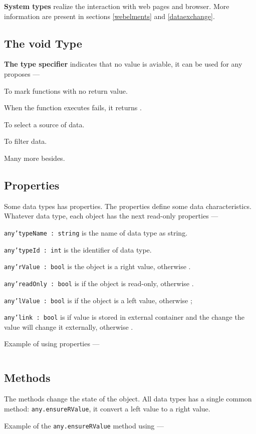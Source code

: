 {\bf System types} realize the interaction with web pages and browser. More information are present in sections \ref{webelments} and \ref{dataexchange}.

\subsection{The {\color{lightblue} void} Type}

{\bf The type specifier \void{}} indicates that no value is aviable, it can be used for any proposes —

\begin{icItems}
\item
	To mark functions with no return value.
\item
	When the function executes fails, it returns \void.
\item
	To select a source of data.
\item
	To filter data.
\item
	Many more besides.
\end{icItems}


\subsection{Properties}

Some data types has properties. The properties define some data characteristics.  Whatever data type, each object has the next read-only properties —

\begin{icItems}
\item
	\texttt{any'typeName : string} is the name of data type as string.
\item
	\texttt{any'typeId : int} is the identifier of data type.
\item
	\texttt{any'rValue : bool} is \true{} the object is a right value, otherwise \false{}.
\item
	\texttt{any'readOnly : bool} is \true{} if the object is read-only, otherwise \false{}.
\item
	\texttt{any'lValue : bool} is \true{} if the object is a left value, otherwise \false{};
\item
	\texttt{any'link : bool} is \true{} if value is stored in external container and the change the value will change it externally, otherwise \false{}.
\end{icItems}

Example of using properties —
\inputminted[linenos]{icl}{../sources/propertiesmain.icL}

\subsection{Methods}

The methods change the state of the object. All data types has a single common method: \texttt{any.ensureRValue}, it convert a left value to a right value.

Example of the \texttt{any.ensureRValue} method using —
\inputminted[linenos]{icl}{../sources/anyensureRValue.icL}

